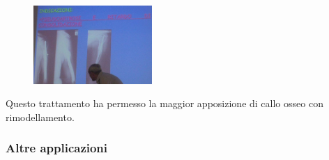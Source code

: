\begin{figure}[!ht]
\centering
\includegraphics[width=0.4\textwidth]{025/image20.jpeg}
\end{figure}

Questo trattamento ha permesso la maggior apposizione di callo osseo con
rimodellamento.

\subsubsection{Altre applicazioni}

